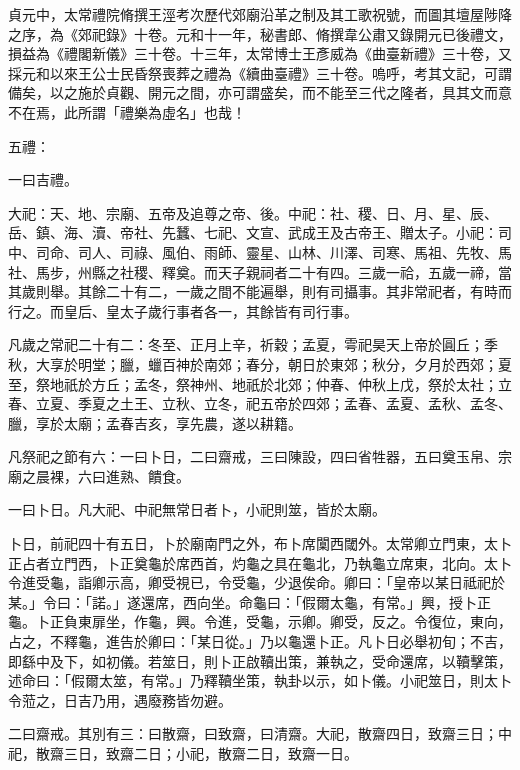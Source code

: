 \begin{pinyinscope}
 貞元中，太常禮院脩撰王涇考次歷代郊廟沿革之制及其工歌祝號，而圖其壇屋陟降之序，為《郊祀錄》十卷。元和十一年，秘書郎、脩撰韋公肅又錄開元已後禮文，損益為《禮閣新儀》三十卷。十三年，太常博士王彥威為《曲臺新禮》三十卷，又採元和以來王公士民昏祭喪葬之禮為《續曲臺禮》三十卷。嗚呼，考其文記，可謂備矣，以之施於貞觀、開元之間，亦可謂盛矣，而不能至三代之隆者，具其文而意不在焉，此所謂「禮樂為虛名」也哉！



 五禮：



 一曰吉禮。



 大祀：天、地、宗廟、五帝及追尊之帝、後。中祀：社、稷、日、月、星、辰、岳、鎮、海、瀆、帝社、先蠶、七祀、文宣、武成王及古帝王、贈太子。小祀：司中、司命、司人、司祿、風伯、雨師、靈星、山林、川澤、司寒、馬祖、先牧、馬社、馬步，州縣之社稷、釋奠。而天子親祠者二十有四。三歲一祫，五歲一禘，當其歲則舉。其餘二十有二，一歲之間不能遍舉，則有司攝事。其非常祀者，有時而行之。而皇后、皇太子歲行事者各一，其餘皆有司行事。



 凡歲之常祀二十有二：冬至、正月上辛，祈穀；孟夏，雩祀昊天上帝於圓丘；季秋，大享於明堂；臘，蠟百神於南郊；春分，朝日於東郊；秋分，夕月於西郊；夏至，祭地祇於方丘；孟冬，祭神州、地祇於北郊；仲春、仲秋上戊，祭於太社；立春、立夏、季夏之土王、立秋、立冬，祀五帝於四郊；孟春、孟夏、孟秋、孟冬、臘，享於太廟；孟春吉亥，享先農，遂以耕籍。



 凡祭祀之節有六：一曰卜日，二曰齋戒，三曰陳設，四曰省牲器，五曰奠玉帛、宗廟之晨裸，六曰進熟、饋食。



 一曰卜日。凡大祀、中祀無常日者卜，小祀則筮，皆於太廟。



 卜日，前祀四十有五日，卜於廟南門之外，布卜席闑西閾外。太常卿立門東，太卜正占者立門西，卜正奠龜於席西首，灼龜之具在龜北，乃執龜立席東，北向。太卜令進受龜，詣卿示高，卿受視已，令受龜，少退俟命。卿曰：「皇帝以某日祗祀於某。」令曰：「諾。」遂還席，西向坐。命龜曰：「假爾太龜，有常。」興，授卜正龜。卜正負東扉坐，作龜，興。令進，受龜，示卿。卿受，反之。令復位，東向，占之，不釋龜，進告於卿曰：「某日從。」乃以龜還卜正。凡卜日必舉初旬；不吉，即繇中及下，如初儀。若筮日，則卜正啟韇出策，兼執之，受命還席，以韇擊策，述命曰：「假爾太筮，有常。」乃釋韇坐策，執卦以示，如卜儀。小祀筮日，則太卜令蒞之，日吉乃用，遇廢務皆勿避。



 二曰齋戒。其別有三：曰散齋，曰致齋，曰清齋。大祀，散齋四日，致齋三日；中祀，散齋三日，致齋二日；小祀，散齋二日，致齋一日。




\end{pinyinscope}
